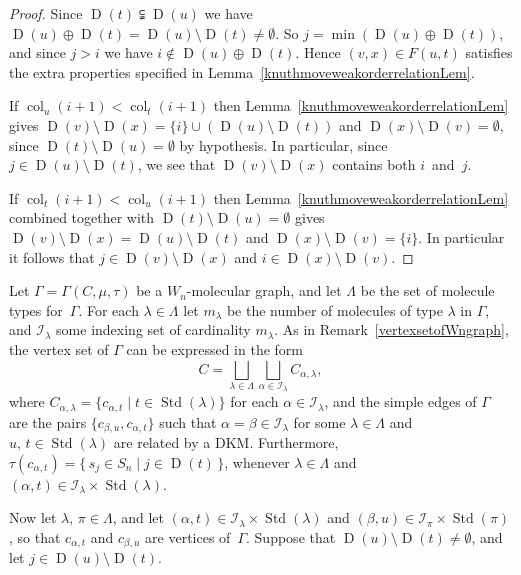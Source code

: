 \documentclass[10pt]{amsart}
\theoremstyle{definition}
\DeclareMathOperator{\col}{col}
\DeclareMathOperator{\STD}{Std}
\DeclareMathOperator{\D}{D}
\begin{document}
\begin{proof}
Since $\D(t)\subsetneqq\D(u)$ we have $\D(u)\oplus\D(t)=\D(u)\setminus\D(t)\neq\emptyset$.
So $j=\min(\D(u)\oplus\D(t))$, and since $j>i$ we have $i\notin\D(u)\oplus\D(t)$. Hence
$(v,x)\in F(u,t)$ satisfies
the extra properties specified in Lemma~\ref{knuthmoveweakorderrelationLem}.

If $\col_u(i+1)<\col_t(i+1)$ then Lemma~\ref{knuthmoveweakorderrelationLem} gives
$\D(v)\setminus\D(x)=\{i\}\cup(\D(u)\setminus\D(t))$ and $\D(x)\setminus\D(v)=\emptyset$,
since $\D(t)\setminus\D(u)=\emptyset$ by hypothesis. In particular, since $j\in\D(u)\setminus\D(t)$,
we see that $\D(v)\setminus\D(x)$ contains both $i$~and~$j$.

If $\col_t(i+1)<\col_u(i+1)$ then Lemma~\ref{knuthmoveweakorderrelationLem} combined together
with $\D(t)\setminus\D(u)=\emptyset$ gives
$\D(v)\setminus\D(x)=\D(u)\setminus\D(t)$ and $\D(x)\setminus\D(v)=\{i\}$.
In particular it follows that $j\in\D(v)\setminus\D(x)$ and $i\in\D(x)\setminus\D(v)$.
\end{proof}

Let $\Gamma=\Gamma(C,\mu,\tau)$ be a $W_n$-molecular graph, and let $\Lambda$
be the set of molecule types for~$\Gamma$. For each $\lambda\in\Lambda$ let
$m_{\lambda}$ be the number of molecules of type $\lambda$ in $\Gamma$, and
$\mathcal{I}_{\lambda}$ some indexing set of cardinality $m_{\lambda}$.
As in Remark~\ref{vertexsetofWngraph}, the
vertex set of $\Gamma$ can be expressed in the form
\begin{equation*}
C=\bigsqcup_{\lambda\in\Lambda}\bigsqcup_{\alpha\in\mathcal{I}_{\lambda}}C_{\alpha,\lambda},
\end{equation*}
where $C_{\alpha,\lambda}=\{c_{\alpha,t}\mid t\in\STD(\lambda)\}$ for each
$\alpha\in\mathcal{I}_{\lambda}$,
and the simple edges of $\Gamma$ are the pairs
$\{c_{\beta,u},c_{\alpha,t}\}$ such that $\alpha=\beta\in\mathcal{I}_{\lambda}$ for some $\lambda\in\Lambda$
and $u,\,t\in\STD(\lambda)$ are related by a DKM.
Furthermore, $\tau(c_{\alpha,t})=\{\,s_j\in S_n\mid j\in\D(t)\,\}$, whenever $\lambda\in\Lambda$ and
$(\alpha,t)\in\mathcal{I}_\lambda\times\STD(\lambda)$.

Now let $\lambda,\,\pi\in\Lambda$, and let $(\alpha,t)\in\mathcal{I}_\lambda\times\STD(\lambda)$ and
$(\beta,u)\in\mathcal{I}_\pi\times\STD(\pi)$, so that $c_{\alpha,t}$ and
$c_{\beta,u}$ are vertices of~$\Gamma$. Suppose that
$\D(u)\setminus\D(t)\neq\emptyset$, and let $j\in\D(u)\setminus\D(t)$.
\end{document}

